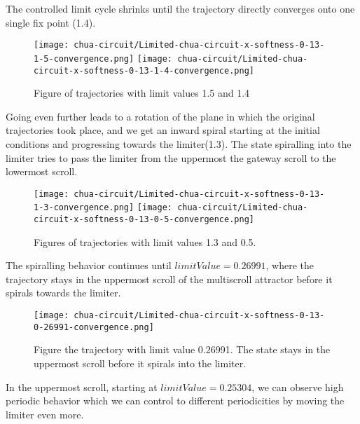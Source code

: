 \documentclass[main]{subfiles}
\begin{document}
The controlled limit cycle shrinks until the trajectory directly converges onto one single fix point (1.4). 

\begin{figure}[H]
\centering
\texttt{[image: chua-circuit/Limited-chua-circuit-x-softness-0-13-1-5-convergence.png]}
\texttt{[image: chua-circuit/Limited-chua-circuit-x-softness-0-13-1-4-convergence.png]}
\caption[Figure of period 1 limit cycle]{Figure of trajectories with limit values 1.5 and 1.4}
\label{figure:x-0.13-convergence-trajectories}
\end{figure}

Going even further leads to a rotation of the plane in which the original trajectories took place, and we get an inward spiral starting at the initial conditions and progressing towards the limiter(1.3). The state spiralling into the limiter tries to pass the limiter from the uppermost the gateway scroll to the lowermost scroll.

\begin{figure}[H]
\centering
\texttt{[image: chua-circuit/Limited-chua-circuit-x-softness-0-13-1-3-convergence.png]}
\texttt{[image: chua-circuit/Limited-chua-circuit-x-softness-0-13-0-5-convergence.png]}
\caption[Figure of period 1 limit cycle]{Figures of trajectories with limit values 1.3 and 0.5.}
\label{figure:x-0.13-spiral-trajectories}
\end{figure}

The spiralling behavior continues until \(limitValue=0.26991\), where the trajectory stays in the uppermost scroll of the multiscroll attractor before it spirals towards the limiter.

\begin{figure}[H]
\centering
\texttt{[image: chua-circuit/Limited-chua-circuit-x-softness-0-13-0-26991-convergence.png]}
\caption[Figure of trajectory with limit value 0.26991.]{Figure the trajectory with limit value 0.26991. The state stays in the uppermost scroll before it spirals into the limiter.}
\label{figure:x-0.13-upper-scroll-trajectory}
\end{figure}

In the uppermost scroll, starting at \(limitValue=0.25304\), we can observe high periodic behavior which we can control to different periodicities by moving the limiter even more. 
\end{document}
